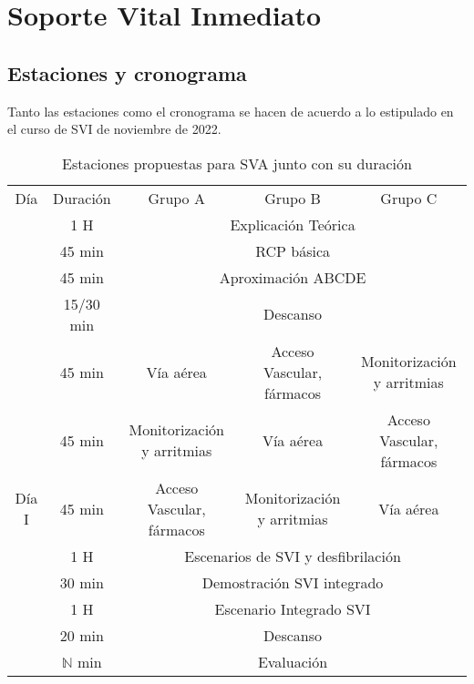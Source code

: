 \chapter{Soporte Vital Inmediato}
\section{Estaciones y cronograma}
Tanto las estaciones como el cronograma se hacen de acuerdo a lo estipulado en el curso de SVI de noviembre de 2022. 

\begin{table}[hptb]
    \centering
    \begin{tabular}{ccccc}
    \rowcolor[HTML]{333333} 
    {\color[HTML]{FFFFFF} Día} & {\color[HTML]{FFFFFF} Duración} & {\color[HTML]{FFFFFF} Grupo A} & {\color[HTML]{FFFFFF} Grupo B} & {\color[HTML]{FFFFFF} Grupo C} \\
     & 1 H & \multicolumn{3}{c}{Explicación Teórica} \\
     & \cellcolor[HTML]{D9D9D9}45 min & \multicolumn{3}{c}{\cellcolor[HTML]{D9D9D9}RCP básica} \\
     & 45 min & \multicolumn{3}{c}{Aproximación ABCDE} \\
     & \cellcolor[HTML]{D9D9D9}15/30 min & \multicolumn{3}{c}{\cellcolor[HTML]{D9D9D9}Descanso} \\
     & 45 min & Vía aérea & Acceso Vascular, fármacos & Monitorización y arritmias \\
     & \cellcolor[HTML]{D9D9D9}45 min & \cellcolor[HTML]{D9D9D9}Monitorización y arritmias & \cellcolor[HTML]{D9D9D9}Vía aérea & \cellcolor[HTML]{D9D9D9}Acceso Vascular,  fármacos \\
    \multirow{-7}{*}{Día I} & 45 min & Acceso Vascular, fármacos & Monitorización y arritmias & Vía aérea \\ \hline
    \rowcolor[HTML]{D9D9D9} 
    \cellcolor[HTML]{D9D9D9} & 1 H & \multicolumn{3}{c}{\cellcolor[HTML]{D9D9D9}Escenarios de SVI y desfibrilación} \\
    \cellcolor[HTML]{D9D9D9} & 30 min & \multicolumn{3}{c}{Demostración SVI integrado} \\
    \rowcolor[HTML]{D9D9D9} 
    \cellcolor[HTML]{D9D9D9} & 1 H & \multicolumn{3}{c}{\cellcolor[HTML]{D9D9D9}Escenario Integrado SVI} \\
    \cellcolor[HTML]{D9D9D9} & 20 min & \multicolumn{3}{c}{Descanso} \\
    \rowcolor[HTML]{D9D9D9} 
    \multirow{-5}{*}{\cellcolor[HTML]{D9D9D9}Día II} & $\mathbb{N}$ min & \multicolumn{3}{c}{\cellcolor[HTML]{D9D9D9}Evaluación} \\ \hline
    \end{tabular}
    \caption{Estaciones propuestas para SVA junto con su duración}
    \label{tab:Brusilov:SVI:Estaciones}
\end{table}